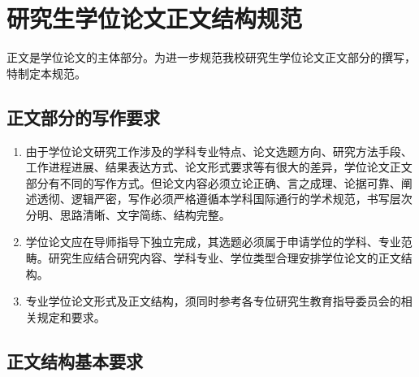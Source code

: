 \chapter[研究生学位论文正文结构规范]{研究生学位论文正文结构规范}
  {
  \let\cleardoublepage\relax
  }

  正文是学位论文的主体部分。为进一步规范我校研究生学位论文正文部分的撰写，特制定本规范。

  \section{正文部分的写作要求}
  \begin{enumerate}
    \item 
    
    由于学位论文研究工作涉及的学科专业特点、论文选题方向、研究方法手段、工作进程进展、结果表达方式、论文形式要求等有很大的差异，学位论文正文部分有不同的写作方式。但论文内容必须立论正确、言之成理、论据可靠、阐述透彻、逻辑严密，写作必须严格遵循本学科国际通行的学术规范，书写层次分明、思路清晰、文字简练、结构完整。
    
    \item 
    
    学位论文应在导师指导下独立完成，其选题必须属于申请学位的学科、专业范畴。研究生应结合研究内容、学科专业、学位类型合理安排学位论文的正文结构。
    
    \item 
    
    专业学位论文形式及正文结构，须同时参考各专位研究生教育指导委员会的相关规定和要求。
  \end{enumerate}

  \section{正文结构基本要求}

